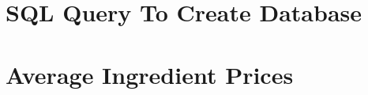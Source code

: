



\cleardoublepage

\frontmatter

\cleardoublepage








\newpage
\mainmatter
\tableofcontents*
\newpage


\listoffixmes




















\begin{appendices}
\centering
\chapter{SQL Query To Create Database}
\label{appendix:createdatabase}

\centering
\chapter{Average Ingredient Prices}
\label{appendix:averageprices}

\end{appendices}



\label{LastPage}
